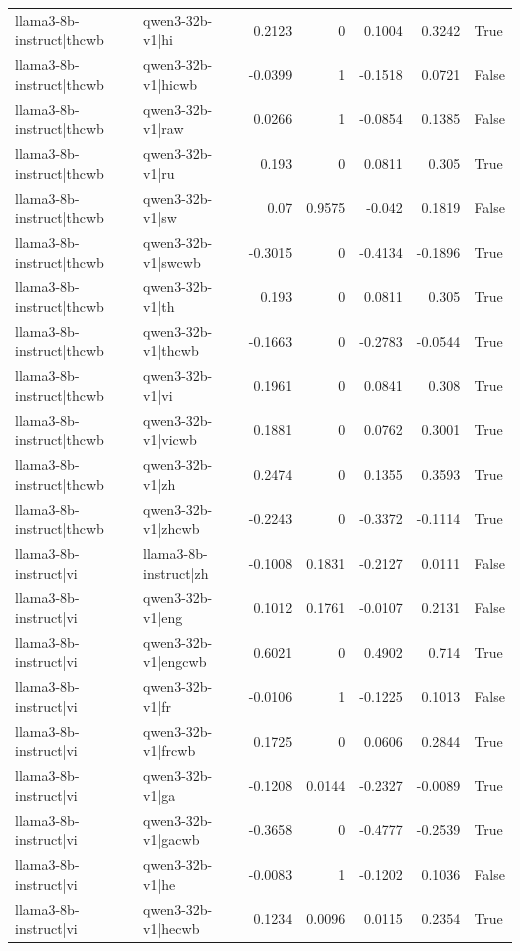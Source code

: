 \begin{table}
\begin{tabular}{l l r r r r l}
llama3-8b-instruct|thcwb & qwen3-32b-v1|hi & 0.2123 & 0 & 0.1004 & 0.3242 & True \\
llama3-8b-instruct|thcwb & qwen3-32b-v1|hicwb & -0.0399 & 1 & -0.1518 & 0.0721 & False \\
llama3-8b-instruct|thcwb & qwen3-32b-v1|raw & 0.0266 & 1 & -0.0854 & 0.1385 & False \\
llama3-8b-instruct|thcwb & qwen3-32b-v1|ru & 0.193 & 0 & 0.0811 & 0.305 & True \\
llama3-8b-instruct|thcwb & qwen3-32b-v1|sw & 0.07 & 0.9575 & -0.042 & 0.1819 & False \\
llama3-8b-instruct|thcwb & qwen3-32b-v1|swcwb & -0.3015 & 0 & -0.4134 & -0.1896 & True \\
llama3-8b-instruct|thcwb & qwen3-32b-v1|th & 0.193 & 0 & 0.0811 & 0.305 & True \\
llama3-8b-instruct|thcwb & qwen3-32b-v1|thcwb & -0.1663 & 0 & -0.2783 & -0.0544 & True \\
llama3-8b-instruct|thcwb & qwen3-32b-v1|vi & 0.1961 & 0 & 0.0841 & 0.308 & True \\
llama3-8b-instruct|thcwb & qwen3-32b-v1|vicwb & 0.1881 & 0 & 0.0762 & 0.3001 & True \\
llama3-8b-instruct|thcwb & qwen3-32b-v1|zh & 0.2474 & 0 & 0.1355 & 0.3593 & True \\
llama3-8b-instruct|thcwb & qwen3-32b-v1|zhcwb & -0.2243 & 0 & -0.3372 & -0.1114 & True \\
llama3-8b-instruct|vi & llama3-8b-instruct|zh & -0.1008 & 0.1831 & -0.2127 & 0.0111 & False \\
llama3-8b-instruct|vi & qwen3-32b-v1|eng & 0.1012 & 0.1761 & -0.0107 & 0.2131 & False \\
llama3-8b-instruct|vi & qwen3-32b-v1|engcwb & 0.6021 & 0 & 0.4902 & 0.714 & True \\
llama3-8b-instruct|vi & qwen3-32b-v1|fr & -0.0106 & 1 & -0.1225 & 0.1013 & False \\
llama3-8b-instruct|vi & qwen3-32b-v1|frcwb & 0.1725 & 0 & 0.0606 & 0.2844 & True \\
llama3-8b-instruct|vi & qwen3-32b-v1|ga & -0.1208 & 0.0144 & -0.2327 & -0.0089 & True \\
llama3-8b-instruct|vi & qwen3-32b-v1|gacwb & -0.3658 & 0 & -0.4777 & -0.2539 & True \\
llama3-8b-instruct|vi & qwen3-32b-v1|he & -0.0083 & 1 & -0.1202 & 0.1036 & False \\
llama3-8b-instruct|vi & qwen3-32b-v1|hecwb & 0.1234 & 0.0096 & 0.0115 & 0.2354 & True \\

\end{tabular}
\end{table}
